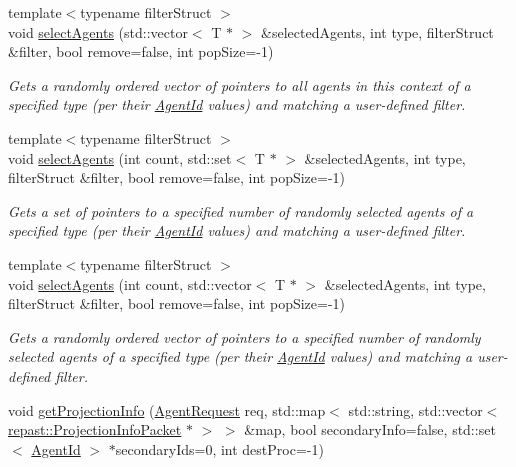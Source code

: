 \begin{DoxyCompactItemize}
{\footnotesize template$<$typename filter\-Struct $>$ }\\void \hyperlink{classrepast_1_1_context_a07cf00b1c5a00b676c5de83e8db438aa}{select\-Agents} (std\-::vector$<$ T $\ast$ $>$ \&selected\-Agents, int type, filter\-Struct \&filter, bool remove=false, int pop\-Size=-\/1)
\begin{DoxyCompactList}\small\item\em Gets a randomly ordered vector of pointers to all agents in this context of a specified type (per their \hyperlink{classrepast_1_1_agent_id}{Agent\-Id} values) and matching a user-\/defined filter. \end{DoxyCompactList}\item 
{\footnotesize template$<$typename filter\-Struct $>$ }\\void \hyperlink{classrepast_1_1_context_afe8f496266275c9edb065c06c6574fc1}{select\-Agents} (int count, std\-::set$<$ T $\ast$ $>$ \&selected\-Agents, int type, filter\-Struct \&filter, bool remove=false, int pop\-Size=-\/1)
\begin{DoxyCompactList}\small\item\em Gets a set of pointers to a specified number of randomly selected agents of a specified type (per their \hyperlink{classrepast_1_1_agent_id}{Agent\-Id} values) and matching a user-\/defined filter. \end{DoxyCompactList}\item 
{\footnotesize template$<$typename filter\-Struct $>$ }\\void \hyperlink{classrepast_1_1_context_ab4aea4be7eaf1c4be741a371e90057a9}{select\-Agents} (int count, std\-::vector$<$ T $\ast$ $>$ \&selected\-Agents, int type, filter\-Struct \&filter, bool remove=false, int pop\-Size=-\/1)
\begin{DoxyCompactList}\small\item\em Gets a randomly ordered vector of pointers to a specified number of randomly selected agents of a specified type (per their \hyperlink{classrepast_1_1_agent_id}{Agent\-Id} values) and matching a user-\/defined filter. \end{DoxyCompactList}\item 
void \hyperlink{classrepast_1_1_context_a8a420350cd434f4e0f30a3d41c93298f}{get\-Projection\-Info} (\hyperlink{classrepast_1_1_agent_request}{Agent\-Request} req, std\-::map$<$ std\-::string, std\-::vector$<$ \hyperlink{classrepast_1_1_projection_info_packet}{repast\-::\-Projection\-Info\-Packet} $\ast$ $>$ $>$ \&map, bool secondary\-Info=false, std\-::set$<$ \hyperlink{classrepast_1_1_agent_id}{Agent\-Id} $>$ $\ast$secondary\-Ids=0, int dest\-Proc=-\/1)

\end{DoxyCompactItemize}
